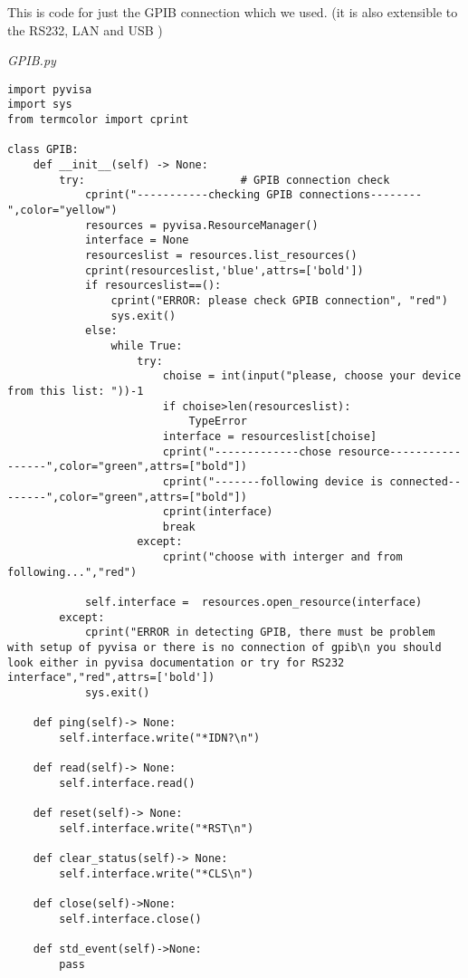 \documentclass[draft,12pt]{article}
\begin{document}
This is code for just the GPIB connection which we used. (it is also extensible to the RS232, LAN and USB )

\emph{GPIB.py}
\begin{verbatim}
import pyvisa
import sys
from termcolor import cprint

class GPIB:
    def __init__(self) -> None:                                 
        try:                        # GPIB connection check
            cprint("-----------checking GPIB connections--------",color="yellow")
            resources = pyvisa.ResourceManager()
            interface = None
            resourceslist = resources.list_resources()
            cprint(resourceslist,'blue',attrs=['bold'])
            if resourceslist==():
                cprint("ERROR: please check GPIB connection", "red")
                sys.exit()
            else:
                while True:
                    try:
                        choise = int(input("please, choose your device from this list: "))-1
                        if choise>len(resourceslist):
                            TypeError
                        interface = resourceslist[choise]
                        cprint("-------------chose resource-----------------",color="green",attrs=["bold"])
                        cprint("-------following device is connected--------",color="green",attrs=["bold"])
                        cprint(interface)
                        break
                    except:
                        cprint("choose with interger and from following...","red")

            self.interface =  resources.open_resource(interface)
        except:
            cprint("ERROR in detecting GPIB, there must be problem with setup of pyvisa or there is no connection of gpib\n you should look either in pyvisa documentation or try for RS232 interface","red",attrs=['bold'])
            sys.exit()

    def ping(self)-> None:
        self.interface.write("*IDN?\n")

    def read(self)-> None:
        self.interface.read()

    def reset(self)-> None:
        self.interface.write("*RST\n")

    def clear_status(self)-> None:
        self.interface.write("*CLS\n")

    def close(self)->None:
        self.interface.close()

    def std_event(self)->None:
        pass

\end{verbatim}
\end{document}
